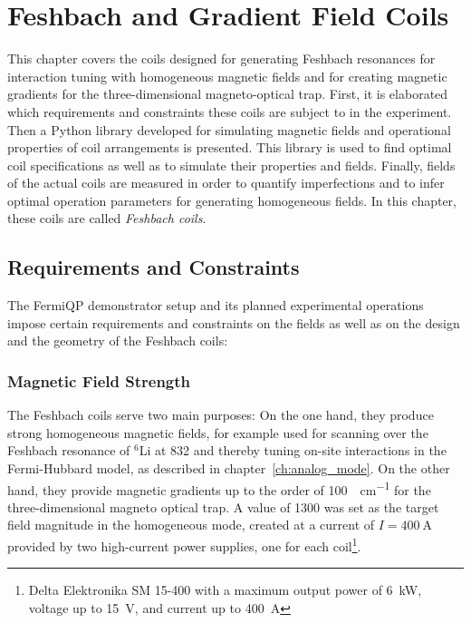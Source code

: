 \renewcommand{\imagepath}{../40-coils/img}

\chapter{Feshbach and Gradient Field Coils}\label{ch:coils}
This chapter covers the coils designed for generating Feshbach resonances for interaction tuning with homogeneous magnetic fields and for creating magnetic gradients for the three-dimensional magneto-optical trap. First, it is elaborated which requirements and constraints these coils are subject to in the experiment. Then a Python library developed for simulating magnetic fields and operational properties of coil arrangements is presented. This library is used to find optimal coil specifications as well as to simulate their properties and fields. Finally, fields of the actual coils are measured in order to quantify imperfections and to infer optimal operation parameters for generating homogeneous fields. In this chapter, these coils are called \textit{Feshbach coils}.

\section{Requirements and Constraints}
The FermiQP demonstrator setup and its planned experimental operations impose certain requirements and constraints on the fields as well as on the design and the geometry of the Feshbach coils:

\subsection*{Magnetic Field Strength}
The Feshbach coils serve two main purposes: On the one hand, they produce strong homogeneous magnetic fields, for example used for scanning over the Feshbach resonance of $^6$Li at \SI{832}{\gauss} and thereby tuning on-site interactions in the Fermi-Hubbard model, as described in chapter~\ref{ch:analog_mode}. On the other hand, they provide magnetic gradients up to the order of \SI[]{100}{\gauss\per\centi\meter} for the three-dimensional magneto optical trap. A value of \SI{1300}{\gauss} was set as the target field magnitude in the homogeneous mode, created at a current of $I = \SI{400}{\ampere}$ provided by two high-current power supplies, one for each coil\footnote{Delta Elektronika SM 15-400 with a maximum output power of \SI[]{6}{\kilo\watt}, voltage up to \SI[]{15}{\volt}, and current up to \SI[]{400}{\ampere}}.

